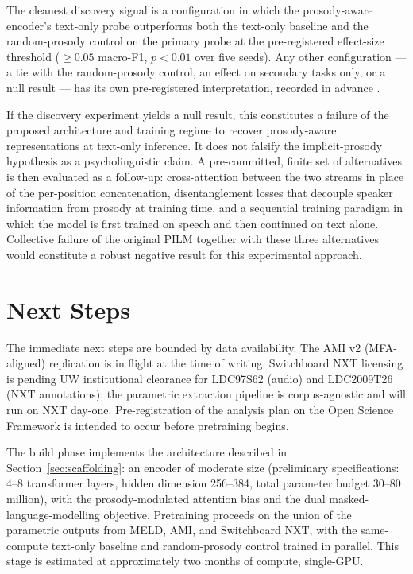 \documentclass[11pt,letterpaper]{article}
\begin{document}
The cleanest discovery signal is a configuration in which the prosody-aware encoder's text-only probe outperforms both the text-only baseline and the random-prosody control on the primary probe at the pre-registered effect-size threshold ($\geq 0.05$ macro-F1, $p < 0.01$ over five seeds). Any other configuration --- a tie with the random-prosody control, an effect on secondary tasks only, or a null result --- has its own pre-registered interpretation, recorded in advance \citep{munafo2017regreports}.

If the discovery experiment yields a null result, this constitutes a failure of the proposed architecture and training regime to recover prosody-aware representations at text-only inference. It does not falsify the implicit-prosody hypothesis as a psycholinguistic claim. A pre-committed, finite set of alternatives is then evaluated as a follow-up: cross-attention between the two streams in place of the per-position concatenation, disentanglement losses that decouple speaker information from prosody at training time, and a sequential training paradigm in which the model is first trained on speech and then continued on text alone. Collective failure of the original PILM together with these three alternatives would constitute a robust negative result for this experimental approach.

\section{Next Steps}\label{sec:next}

The immediate next steps are bounded by data availability. The AMI v2 (MFA-aligned) replication is in flight at the time of writing. Switchboard NXT licensing is pending UW institutional clearance for LDC97S62 (audio) and LDC2009T26 (NXT annotations); the parametric extraction pipeline is corpus-agnostic and will run on NXT day-one. Pre-registration of the analysis plan on the Open Science Framework \citep{munafo2017regreports} is intended to occur before pretraining begins.

The build phase implements the architecture described in Section~\ref{sec:scaffolding}: an encoder of moderate size (preliminary specifications: 4--8 transformer layers, hidden dimension 256--384, total parameter budget 30--80 million), with the prosody-modulated attention bias and the dual masked-language-modelling objective. Pretraining proceeds on the union of the parametric outputs from MELD, AMI, and Switchboard NXT, with the same-compute text-only baseline and random-prosody control trained in parallel. This stage is estimated at approximately two months of compute, single-GPU.
\end{document}
